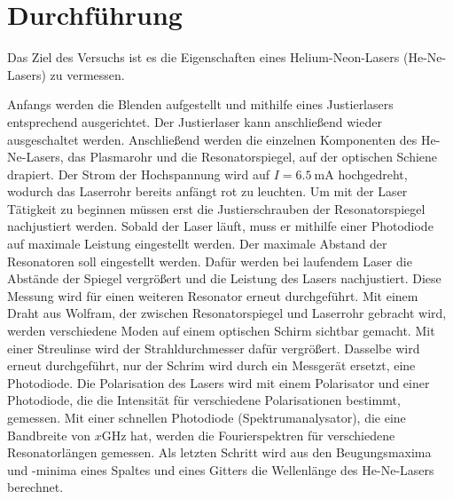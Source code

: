 \section{Durchführung}
\label{sec:Durchführung}

Das Ziel des Versuchs ist es die Eigenschaften eines Helium-Neon-Lasers (He-Ne-Lasers) zu vermessen. 

Anfangs werden die Blenden aufgestellt und mithilfe eines Justierlasers entsprechend ausgerichtet. Der Justierlaser kann anschließend wieder ausgeschaltet werden. 
Anschließend werden die einzelnen Komponenten des He-Ne-Lasers, das Plasmarohr und die Resonatorspiegel, auf der optischen Schiene drapiert. 
Der Strom der Hochspannung wird auf $ I = \SI{6.5}{\milli\ampere}$ hochgedreht, wodurch das Laserrohr bereits anfängt rot zu leuchten.
Um mit der Laser Tätigkeit zu beginnen müssen erst die Justierschrauben der Resonatorspiegel nachjustiert werden. 
Sobald der Laser läuft, muss er mithilfe einer Photodiode auf maximale Leistung eingestellt werden.
Der maximale Abstand der Resonatoren soll eingestellt werden. Dafür werden bei laufendem Laser die Abstände der Spiegel vergrößert und die Leistung des Lasers nachjustiert. 
Diese Messung wird für einen weiteren Resonator erneut durchgeführt. 
Mit einem Draht aus Wolfram, der zwischen Resonatorspiegel und Laserrohr gebracht wird, werden verschiedene Moden auf einem optischen Schirm sichtbar gemacht. Mit einer Streulinse wird der Strahldurchmesser dafür vergrößert. 
Dasselbe wird erneut durchgeführt, nur der Schrim wird durch ein Messgerät ersetzt, eine Photodiode. 
Die Polarisation des Lasers wird mit einem Polarisator und einer Photodiode, die die Intensität für verschiedene Polarisationen bestimmt, gemessen. 
Mit einer schnellen Photodiode (Spektrumanalysator), die eine Bandbreite von $x \si{\giga\hertz}$ hat, werden die Fourierspektren für verschiedene Resonatorlängen gemessen. 
Als letzten Schritt wird aus den Beugungsmaxima und -minima eines Spaltes und eines Gitters die Wellenlänge des He-Ne-Lasers berechnet.

